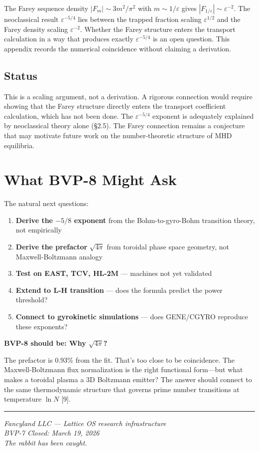 \documentclass[11pt,letterpaper]{article}
\begin{document}
The Farey sequence density $|F_m| \sim 3m^2/\pi^2$ with $m \sim 1/\varepsilon$ gives $|F_{1/\varepsilon}| \sim \varepsilon^{-2}$. The neoclassical result $\varepsilon^{-5/4}$ lies between the trapped fraction scaling $\varepsilon^{1/2}$ and the Farey density scaling $\varepsilon^{-2}$. Whether the Farey structure enters the transport calculation in a way that produces exactly $\varepsilon^{-5/4}$ is an open question. This appendix records the numerical coincidence without claiming a derivation.

\subsection{Status}

This is a scaling argument, not a derivation. A rigorous connection would require showing that the Farey structure directly enters the transport coefficient calculation, which has not been done. The $\varepsilon^{-5/4}$ exponent is adequately explained by neoclassical theory alone (\S2.5). The Farey connection remains a conjecture that may motivate future work on the number-theoretic structure of MHD equilibria.

\section{What BVP-8 Might Ask}

The natural next questions:
\begin{enumerate}[noitemsep]
\item \textbf{Derive the $-5/8$ exponent} from the Bohm-to-gyro-Bohm transition theory, not empirically
\item \textbf{Derive the prefactor} $\sqrt{4\pi}$ from toroidal phase space geometry, not Maxwell-Boltzmann analogy
\item \textbf{Test on EAST, TCV, HL-2M} --- machines not yet validated
\item \textbf{Extend to L-H transition} --- does the formula predict the power threshold?
\item \textbf{Connect to gyrokinetic simulations} --- does GENE/CGYRO reproduce these exponents?
\end{enumerate}

\textbf{BVP-8 should be: Why $\sqrt{4\pi}$?}

The prefactor is 0.93\% from the fit. That's too close to be coincidence. The Maxwell-Boltzmann flux normalization is the right functional form---but what makes a toroidal plasma a 3D Boltzmann emitter? The answer should connect to the same thermodynamic structure that governs prime number transitions at temperature $\ln N$ [9].

\vspace{2em}
\hrule
\vspace{0.5em}
\begin{center}
\textit{Fancyland LLC --- Lattice OS research infrastructure}\\[0.3em]
\textit{BVP-7 Closed: March 19, 2026}\\[0.3em]
\textit{The rabbit has been caught.}
\end{center}
\end{document}
